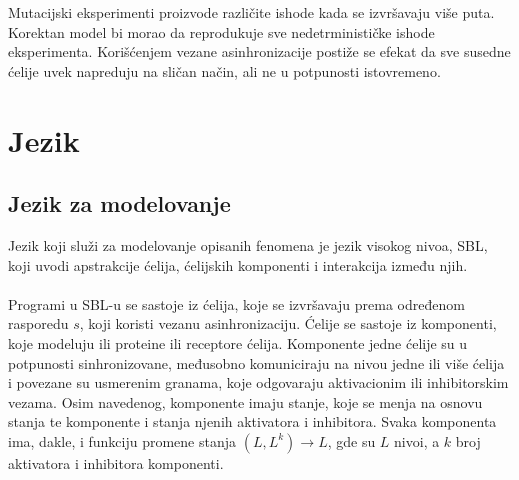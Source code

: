 \documentclass[a4paper]{article}
\begin{document}
Mutacijski eksperimenti proizvode različite ishode kada se izvršavaju više puta. Korektan model bi morao da reprodukuje sve nedetrminističke ishode eksperimenta. Korišćenjem vezane asinhronizacije postiže se efekat da sve susedne ćelije uvek napreduju na sličan način, ali ne u potpunosti istovremeno. 

\section{Jezik}
\subsection{Jezik za modelovanje}
Jezik koji služi za modelovanje opisanih fenomena je jezik visokog nivoa, SBL, koji uvodi apstrakcije ćelija, ćelijskih komponenti i interakcija između njih. \\\\
Programi u SBL-u se sastoje iz ćelija, koje se izvršavaju prema određenom rasporedu $s$, koji koristi vezanu asinhronizaciju. Ćelije se sastoje iz komponenti, koje modeluju ili proteine ili receptore ćelija. Komponente jedne ćelije su u potpunosti sinhronizovane, međusobno komuniciraju na nivou jedne ili više ćelija i povezane su usmerenim granama, koje odgovaraju aktivacionim ili inhibitorskim vezama. Osim navedenog, komponente imaju stanje, koje se menja na osnovu stanja te komponente i stanja njenih aktivatora i inhibitora. Svaka komponenta ima, dakle, i funkciju promene stanja $(L, L^k) \rightarrow L$, gde su $L$ nivoi, a $k$ broj aktivatora i inhibitora komponenti. 
\end{document}
